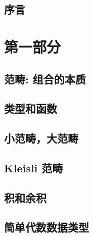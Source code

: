 


\frontmatter
\tableofcontents


\chapter*{序言}
\label{序言}


\mainmatter

\part*{第一部分}

\chapter{范畴: 组合的本质}\label{category-the-essence-of-composition}


\chapter{类型和函数}\label{types-and-functions}


\chapter{小范畴，大范畴}\label{categories-great-and-small}


\chapter{Kleisli 范畴}\label{kleisli-categories}


\chapter{积和余积}\label{products-and-coproducts}


\chapter{简单代数数据类型}\label{simple-algebraic-data-types}


